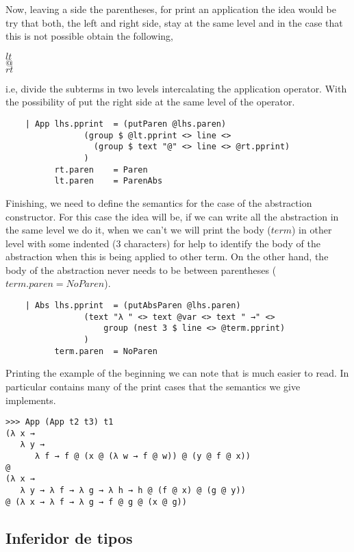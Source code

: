 \documentclass[a4paper,10pt]{article}
\begin{document}
Now, leaving a side the parentheses, for print an application the idea would be try that
both, the left and right side, stay at the same level and in the case that this is not
possible obtain the following,

\begin{center}
$lt$\\
$@$\\
$rt$
\end{center}

i.e, divide the subterms in two levels intercalating the application operator. With the
possibility of put the right side at the same level of the operator.

\begin{lstlisting}    
    | App lhs.pprint  = (putParen @lhs.paren) 
                (group $ @lt.pprint <> line <> 
                  (group $ text "@" <> line <> @rt.pprint)
                )
          rt.paren    = Paren
          lt.paren    = ParenAbs
\end{lstlisting}    

Finishing, we need to define the semantics for the case of the abstraction constructor.
For this case the idea will be, if we can write all the abstraction in the same level
we do it, when we can't we will print the body ($term$) in other level with some
indented (3 characters) for help to identify the body of the abstraction when this
is being applied to other term. On the other hand, the body of the abstraction never
needs to be between parentheses ($term.paren = NoParen$).

\begin{lstlisting}
    | Abs lhs.pprint  = (putAbsParen @lhs.paren)
                (text "λ " <> text @var <> text " →" <> 
                    group (nest 3 $ line <> @term.pprint)
                )
          term.paren  = NoParen
\end{lstlisting}

Printing the example of the beginning we can note that is much easier to read. In
particular contains many of the print cases that the semantics we give implements.

\begin{verbatim}
>>> App (App t2 t3) t1
(λ x →
   λ y →
      λ f → f @ (x @ (λ w → f @ w)) @ (y @ f @ x))
@
(λ x →
   λ y → λ f → λ g → λ h → h @ (f @ x) @ (g @ y))
@ (λ x → λ f → λ g → f @ g @ (x @ g))
\end{verbatim}

\subsection{Inferidor de tipos}
\end{document}
